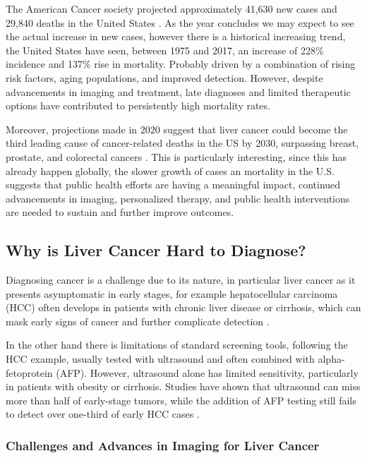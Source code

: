 \documentclass[11pt]{article} %
\begin{document}
\begin{multicols}{2}
The American Cancer society projected approximately 41,630 new cases and 29,840 deaths in the United States \cite{cancer_stats2024}. As the year concludes we may expect to see the actual increase in new cases, however there is a historical increasing trend, the United States have seen, between 1975 and 2017, an increase of 228\% incidence and 137\% rise in mortality. Probably driven by a combination of rising risk factors, aging populations, and improved detection. However, despite advancements in imaging and treatment, late diagnoses and limited therapeutic options have contributed to persistently high mortality rates.

Moreover, projections made in 2020 suggest that liver cancer could become the third leading cause of cancer-related deaths in the US by 2030, surpassing breast, prostate, and colorectal cancers \cite{aacr_2030}. This is particularly interesting, since this has already happen globally, the slower growth of cases an mortality in the U.S. suggests that public health efforts are having a meaningful impact, continued advancements in imaging, personalized therapy, and public health interventions are needed to sustain and further improve outcomes.

\subsection{Why is Liver Cancer Hard to Diagnose?}
Diagnosing cancer is a challenge due to its nature, in particular liver cancer as it presents asymptomatic in early stages, for example hepatocellular carcinoma (HCC) often develops in patients with chronic liver disease or cirrhosis, which can mask early signs of cancer and further complicate detection \cite{quaglia2018}.

In the other hand there is limitations of standard screening tools, following the HCC example, usually tested with ultrasound and often combined with alpha-fetoprotein (AFP). However, ultrasound alone has limited sensitivity, particularly in patients with obesity or cirrhosis.\cite{floridi2022} Studies have shown that ultrasound can miss more than half of early-stage tumors, while the addition of AFP testing still fails to detect over one-third of early HCC cases \cite{mcmahon2023}.

\subsubsection{Challenges and Advances in Imaging for Liver Cancer}


\end{multicols}
\end{document}
